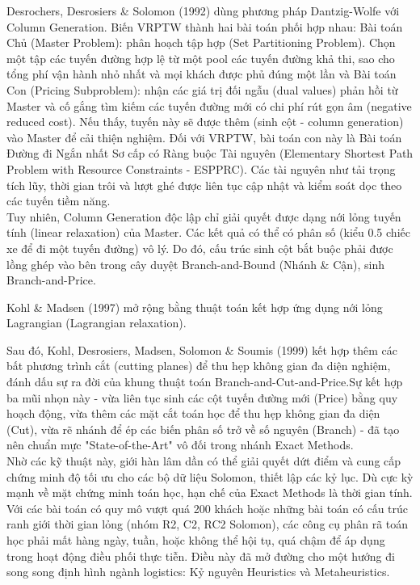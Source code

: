 \documentclass[13pt, a4paper]{extarticle} %
\begin{document}
Desrochers, Desrosiers \& Solomon (1992) dùng phương pháp Dantzig-Wolfe với Column Generation. Biến VRPTW thành hai bài toán phối hợp nhau: Bài toán Chủ (Master Problem): phân hoạch tập hợp (Set Partitioning Problem). Chọn một tập các tuyến đường hợp lệ từ một pool các tuyến đường khả thi, sao cho tổng phí vận hành nhỏ nhất và mọi khách được phủ đúng một lần và Bài toán Con (Pricing Subproblem): nhận các giá trị đối ngẫu (dual values) phản hồi từ Master và cố gắng tìm kiếm các tuyến đường mới có chi phí rút gọn âm (negative reduced cost). Nếu thấy, tuyến này sẽ được thêm (sinh cột - column generation) vào Master để cải thiện nghiệm. Đối với VRPTW, bài toán con này là Bài toán Đường đi Ngắn nhất Sơ cấp có Ràng buộc Tài nguyên (Elementary Shortest Path Problem with Resource Constraints - ESPPRC). Các tài nguyên như tải trọng tích lũy, thời gian trôi và lượt ghé được liên tục cập nhật và kiểm soát dọc theo các tuyến tiềm năng.\\
Tuy nhiên, Column Generation độc lập chỉ giải quyết được dạng nới lỏng tuyến tính (linear relaxation) của Master. Các kết quả có thể có phân số (kiểu 0.5 chiếc xe để đi một tuyến đường) vô lý. Do đó, cấu trúc sinh cột bắt buộc phải được lồng ghép vào bên trong cây duyệt Branch-and-Bound (Nhánh \& Cận), sinh Branch-and-Price.\vspace{0.25cm}

Kohl \& Madsen (1997) mở rộng bằng thuật toán kết hợp ứng dụng nới lỏng Lagrangian (Lagrangian relaxation).\vspace{0.5cm}

Sau đó, Kohl, Desrosiers, Madsen, Solomon \& Soumis (1999) kết hợp thêm các bất phương trình cắt (cutting planes) để thu hẹp không gian đa diện nghiệm, đánh dấu sự ra đời của khung thuật toán Branch-and-Cut-and-Price.Sự kết hợp ba mũi nhọn này - vừa liên tục sinh các cột tuyến đường mới (Price) bằng quy hoạch động, vừa thêm các mặt cắt toán học để thu hẹp không gian đa diện (Cut), vừa rẽ nhánh để ép các biến phân số trở về số nguyên (Branch) - đã tạo nên chuẩn mực "State-of-the-Art" vô đối trong nhánh Exact Methods. \\
Nhờ các kỹ thuật này, giới hàn lâm dần có thể giải quyết dứt điểm và cung cấp chứng minh độ tối ưu cho các bộ dữ liệu Solomon, thiết lập các kỷ lục. Dù cực kỳ mạnh về mặt chứng minh toán học, hạn chế của Exact Methods là thời gian tính. Với các bài toán có quy mô vượt quá 200 khách hoặc những bài toán có cấu trúc ranh giới thời gian lỏng (nhóm R2, C2, RC2 Solomon), các công cụ phân rã toán học phải mất hàng ngày, tuần, hoặc không thể hội tụ, quá chậm để áp dụng trong hoạt động điều phối thực tiễn. Điều này đã mở đường cho một hướng đi song song định hình ngành logistics: Kỷ nguyên Heuristics và Metaheuristics.\vspace{0.5cm}
\end{document}
